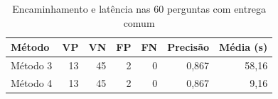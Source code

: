 \begin{table}[htbp]
\centering
\small
\caption{Encaminhamento e latência nas 60 perguntas com entrega comum}
\label{tab:comparacao_pareada}
\begin{tabular}{lrrrrrr}
\hline
Método & VP & VN & FP & FN & Precisão & Média (s) \\
\hline
Método 3 & 13 & 45 & 2 & 0 & 0,867 & 58,16 \\
Método 4 & 13 & 45 & 2 & 0 & 0,867 & 9,16 \\
\hline
\end{tabular}
\end{table}
